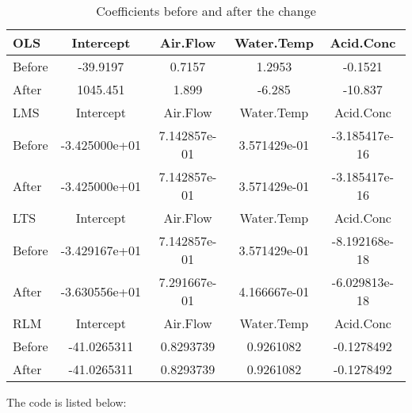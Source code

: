 \documentclass[12pt]{article}
\begin{document}
\begin{table}[!hbp]
  \begin{center}
    \begin{tabular}{|l|c|c|c|c|}
      \hline
      \hline
      OLS    & Intercept & Air.Flow & Water.Temp & Acid.Conc \\ \hline
      Before &  -39.9197 &   0.7157 &     1.2953 & -0.1521   \\ \hline
      After  &  1045.451 &    1.899 &     -6.285 & -10.837   \\ \hline
      \hline
      LMS    & Intercept & Air.Flow & Water.Temp & Acid.Conc \\ \hline
      Before & -3.425000e+01 & 7.142857e-01 & 3.571429e-01 &
      -3.185417e-16 \\ \hline 
      After  & -3.425000e+01 & 7.142857e-01 & 3.571429e-01 &
      -3.185417e-16  \\ \hline 
      \hline
      LTS    & Intercept & Air.Flow & Water.Temp & Acid.Conc \\ \hline
      Before & -3.429167e+01 & 7.142857e-01 & 3.571429e-01 &
      -8.192168e-18 \\ \hline
      After  & -3.630556e+01 & 7.291667e-01 & 4.166667e-01 &
      -6.029813e-18 \\ \hline
      \hline
      RLM    & Intercept & Air.Flow & Water.Temp & Acid.Conc \\ \hline
      Before & -41.0265311 & 0.8293739 & 0.9261082 & -0.1278492 \\ \hline
      After  & -41.0265311 & 0.8293739 & 0.9261082 & -0.1278492 \\ \hline
      \hline
    \end{tabular}
  \end{center}
  \caption{Coefficients before and after the change \label{tab:q3}}
\end{table}

\appendix
\appendixpage
\addappheadtotoc

The code is listed below:


\end{document}
